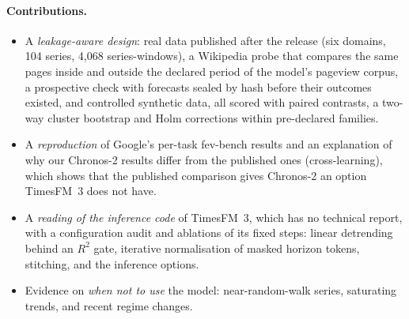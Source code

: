 \paragraph{Contributions.}
\begin{itemize}
\item A \emph{leakage-aware design}: real data published after the release (six domains, 104 series, 4{,}068 series-windows), a
Wikipedia probe that compares the same pages inside and outside the declared period of the model's pageview corpus, a prospective check with
forecasts sealed by hash before their outcomes existed, and controlled synthetic data, all scored with paired contrasts, a two-way
cluster bootstrap and Holm corrections within pre-declared families.
\item A \emph{reproduction} of Google's per-task fev-bench results and an explanation of why our Chronos-2 results differ from the
published ones (cross-learning), which shows that the published comparison gives Chronos-2 an option TimesFM~3 does not have.
\item A \emph{reading of the inference code} of TimesFM~3, which has no technical report, with a configuration audit and ablations of
its fixed steps: linear detrending behind an $R^2$ gate, iterative normalisation of masked horizon tokens, stitching, and the
inference options.
\item Evidence on \emph{when not to use} the model: near-random-walk series, saturating trends, and recent regime changes.
\end{itemize}



